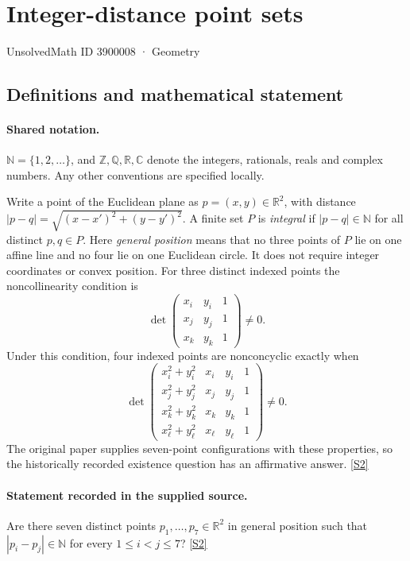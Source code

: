 \documentclass[11pt]{book}
\newcommand{\sref}[2]{\hyperlink{source:#1:#2}{[S#2]}}
\begin{document}
\setcounter{section}{3900007}
\section{Integer-distance point sets}\label{3900008}
{\small\sffamily UnsolvedMath ID 3900008 · Geometry}
\subsection{Definitions and mathematical statement}

\paragraph{Shared notation.}$\mathbb N=\{1,2,\ldots\}$, and $\mathbb Z,\mathbb Q,\mathbb R,\mathbb C$ denote the integers, rationals, reals and complex numbers. Any other conventions are specified locally.


Write a point of the Euclidean plane as $p=(x,y)\in\mathbb R^2$, with distance $|p-q|=\sqrt{(x-x')^2+(y-y')^2}$. A finite set $P$ is \emph{integral} if $|p-q|\in\mathbb N$ for all distinct $p,q\in P$. Here \emph{general position} means that no three points of $P$ lie on one affine line and no four lie on one Euclidean circle. It does not require integer coordinates or convex position.
For three distinct indexed points the noncollinearity condition is
\[
\det\begin{pmatrix}x_i&y_i&1\\x_j&y_j&1\\x_k&y_k&1\end{pmatrix}\ne0.
\]
Under this condition, four indexed points are nonconcyclic exactly when
\[
\det\begin{pmatrix}
x_i^2+y_i^2&x_i&y_i&1\\
x_j^2+y_j^2&x_j&y_j&1\\
x_k^2+y_k^2&x_k&y_k&1\\
x_\ell^2+y_\ell^2&x_\ell&y_\ell&1
\end{pmatrix}\ne0.
\]
The original paper supplies seven-point configurations with these properties, so the historically recorded existence question has an affirmative answer. \sref{3900008}{2}
\paragraph{Statement recorded in the supplied source.}
Are there seven distinct points $p_1,\ldots,p_7\in\mathbb R^2$ in general position such that $|p_i-p_j|\in\mathbb N$ for every $1\le i<j\le7$? \sref{3900008}{2}
\end{document}
